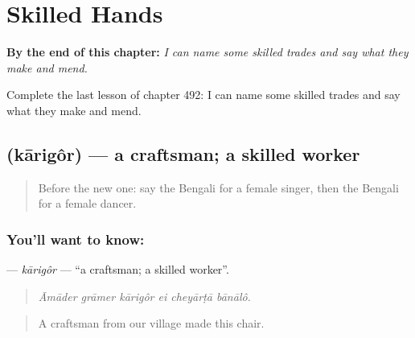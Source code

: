
\chapter{Skilled Hands}
\label{ch:bn-skilled-hands}

\begin{chapteropening}
\textbf{By the end of this chapter:} \emph{I can name some skilled trades and say what they make and mend.}

Complete the last lesson of chapter 492: I can name some skilled trades and say what they make and mend.
\end{chapteropening}

\section[\texorpdfstring{\bn{কারিগর} (kārigôr)}{কারিগর (kārigôr)}]{ (kārigôr) — a craftsman; a skilled worker}

\label{lesson:BN-C492-karigor}



\begin{quote}
Before the new one: say the Bengali for a female singer, then the Bengali for a female dancer.
\end{quote}

\subsection*{You'll want to know: }
\textbf{} — \emph{kārigôr} — \textquotedblleft{}a craftsman; a skilled worker\textquotedblright{}.

\begin{quote}
     
\end{quote}

\begin{quote}
\emph{Āmāder grāmer kārigôr ei cheyārṭā bānālô.}
\end{quote}

\begin{quote}
A craftsman from our village made this chair.
\end{quote}


